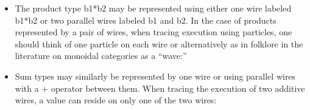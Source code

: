 \documentclass{llncs}
\begin{document}
\begin{itemize}
\item The product type {{b1*b2}} may be represented using either one wire
  labeled {{b1*b2}} or two parallel wires labeled {{b1}} and {{b2}}. In the
  case of products represented by a pair of wires, when tracing execution
  using particles, one should think of one particle on each wire or
  alternatively as in folklore in the literature on monoidal categories as a
  ``wave:''
\begin{multicols}{4}
\begin{center}
\end{center}
\columnbreak
\begin{center}
\end{center}
\begin{center}
\end{center}
\begin{center}
\end{center}
\end{multicols}

\item Sum types may similarly be represented by one wire or using parallel
  wires with a {{+}} operator between them. When tracing the execution of two
  additive wires, a value can reside on only one of the two wires:
\begin{multicols}{4}


\end{multicols}
\end{itemize}
\end{document}
